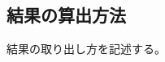 \documentclass[../../../main]{subfiles}
\begin{document}
    \subsection{結果の算出方法}\label{subsec:method-calculation}

    結果の取り出し方を記述する。
\end{document}
